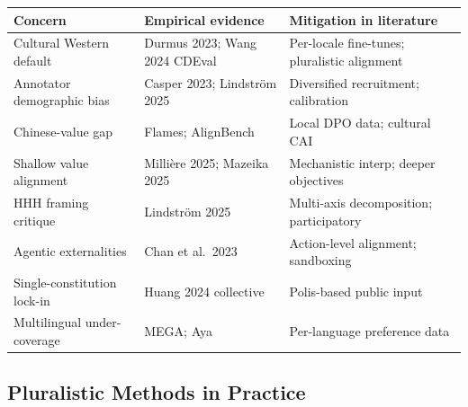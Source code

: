 {\def\LTcaptype{none} %
\begin{longtable}[]{@{}
  >{\raggedright\arraybackslash}p{}
  >{\raggedright\arraybackslash}p{}
  >{\raggedright\arraybackslash}p{}@{}}
\toprule\noalign{}
\begin{minipage}[b]{\linewidth}\raggedright
Concern
\end{minipage} & \begin{minipage}[b]{\linewidth}\raggedright
Empirical evidence
\end{minipage} & \begin{minipage}[b]{\linewidth}\raggedright
Mitigation in literature
\end{minipage} \\
\midrule\noalign{}
\endhead
\bottomrule\noalign{}
\endlastfoot
Cultural Western default & Durmus 2023; Wang 2024 CDEval & Per-locale fine-tunes; pluralistic alignment \\
Annotator demographic bias & Casper 2023; Lindström 2025 & Diversified recruitment; calibration \\
Chinese-value gap & Flames; AlignBench & Local DPO data; cultural CAI \\
Shallow value alignment & Millière 2025; Mazeika 2025 & Mechanistic interp; deeper objectives \\
HHH framing critique & Lindström 2025 & Multi-axis decomposition; participatory \\
Agentic externalities & Chan et al.~2023 & Action-level alignment; sandboxing \\
Single-constitution lock-in & Huang 2024 collective & Polis-based public input \\
Multilingual under-coverage & MEGA; Aya & Per-language preference data \\
\end{longtable}
}

\subsection{Pluralistic Methods in Practice}\label{pluralistic-methods-in-practice}

